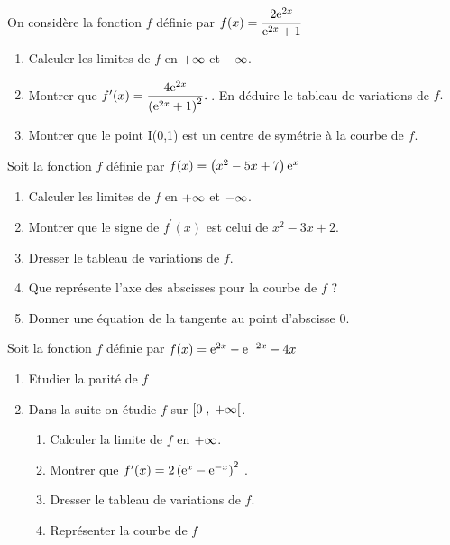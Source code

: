  \begin{exercice}

 On considère la fonction $ f $ définie par $ f(x)=\dfrac{2\mathrm{e}^{2x}}{\mathrm{e}^{2x}+1} $
 \begin{enumerate}
 \item Calculer  les limites de $ f $  en $+\infty $ et $ -\infty$.
 \item Montrer que $ f^{\prime} (x)=\dfrac{4\mathrm{e}^{2x}}{\left(\mathrm{e}^{2x}+1\right)^{2}}.\:$.\; En  déduire le tableau de variations de $ f. $
 \item Montrer que le point I(0,1) est un centre de symétrie à la courbe de $ f. $
 \end{enumerate}
  \end{exercice}



 \begin{exercice}
Soit la fonction $ f $ définie par $ f(x)=\left(x^{2}-5x+7\right)\mathrm{e}^{x} $
 \begin{enumerate}
 \item Calculer  les limites de $ f $  en $+\infty $ et $ -\infty$.
 \item Montrer que  le signe de  $ f^{\prime} (x)$  est celui de $ x^{2}-3x+2 $.
 \item Dresser le tableau de variations de $ f. $
 \item Que représente l'axe des abscisses pour la courbe de $ f $  ?
 \item Donner une équation de la tangente au point d'abscisse 0.
 \end{enumerate}
  \end{exercice}
  
  \begin{exercice}
Soit la fonction $ f $ définie par $ f(x)=\mathrm{e}^{2x}-\mathrm{e}^{-2x}-4x $
\begin{enumerate}
 \item Etudier la parité de $ f $
 \item
 Dans la suite on étudie $ f $  sur $ \left[0 \;,\; +\infty\right[ $.
 \begin{enumerate}
 \item Calculer  la limite de $ f $  en $+\infty $.
 \item Montrer que   $ f^{\prime} (x)=2\left(\mathrm{e}^{x}-\mathrm{e}^{-x}\right)^{2}$ .
 \item Dresser le tableau de variations de $ f. $
 \item Représenter la courbe de $ f $  
 
 \end{enumerate}
  \end{enumerate}
  \end{exercice}
  
